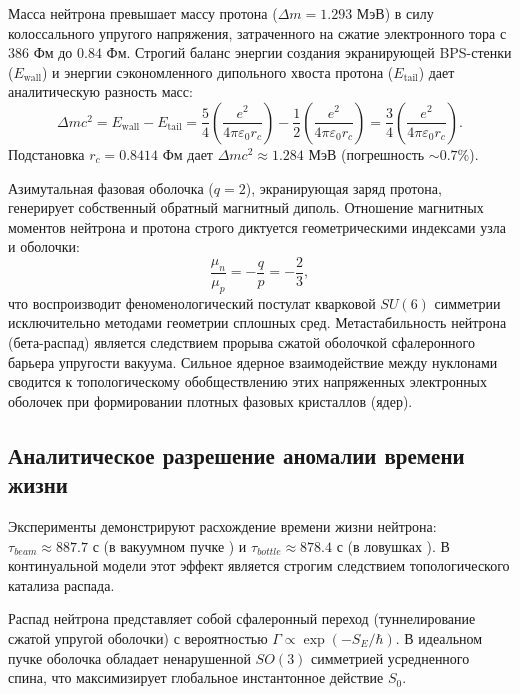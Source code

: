 \documentclass[12pt,a4paper]{article}
\begin{document}
Масса нейтрона превышает массу протона ($\Delta m = 1.293$ МэВ) в силу колоссального упругого напряжения, затраченного на сжатие электронного тора с $386$ Фм до $0.84$ Фм. Строгий баланс энергии создания экранирующей BPS-стенки ($E_{\text{wall}}$) и энергии сэкономленного дипольного хвоста протона ($E_{\text{tail}}$) дает аналитическую разность масс:
\begin{equation}
	\Delta m c^2 = E_{\text{wall}} - E_{\text{tail}} = \frac{5}{4} \left( \frac{e^2}{4\pi\varepsilon_0 r_c} \right) - \frac{1}{2} \left( \frac{e^2}{4\pi\varepsilon_0 r_c} \right) = \frac{3}{4} \left( \frac{e^2}{4\pi\varepsilon_0 r_c} \right).
\end{equation}
Подстановка $r_c = 0.8414$ Фм дает $\Delta m c^2 \approx 1.284$ МэВ (погрешность $\sim 0.7\%$).

Азимутальная фазовая оболочка ($q=2$), экранирующая заряд протона, генерирует собственный обратный магнитный диполь. Отношение магнитных моментов нейтрона и протона строго диктуется геометрическими индексами узла и оболочки:
\begin{equation}
	\frac{\mu_n}{\mu_p} = -\frac{q}{p} = -\frac{2}{3},
\end{equation}
что воспроизводит феноменологический постулат кварковой $SU(6)$ симметрии исключительно методами геометрии сплошных сред. Метастабильность нейтрона (бета-распад) является следствием прорыва сжатой оболочкой сфалеронного барьера упругости вакуума. Сильное ядерное взаимодействие между нуклонами сводится к топологическому обобществлению этих напряженных электронных оболочек при формировании плотных фазовых кристаллов (ядер).
\subsection{Аналитическое разрешение аномалии времени жизни}
Эксперименты демонстрируют расхождение времени жизни нейтрона: $\tau_{beam} \approx 887.7$ с (в вакуумном пучке \cite{beam2013}) и $\tau_{bottle} \approx 878.4$ с (в ловушках \cite{bottle2021}). В континуальной модели этот эффект является строгим следствием топологического катализа распада.

Распад нейтрона представляет собой сфалеронный переход (туннелирование сжатой упругой оболочки) с вероятностью $\Gamma \propto \exp(-S_E/\hbar)$. В идеальном пучке оболочка обладает ненарушенной $SO(3)$ симметрией усредненного спина, что максимизирует глобальное инстантонное действие $S_0$.
\end{document}
